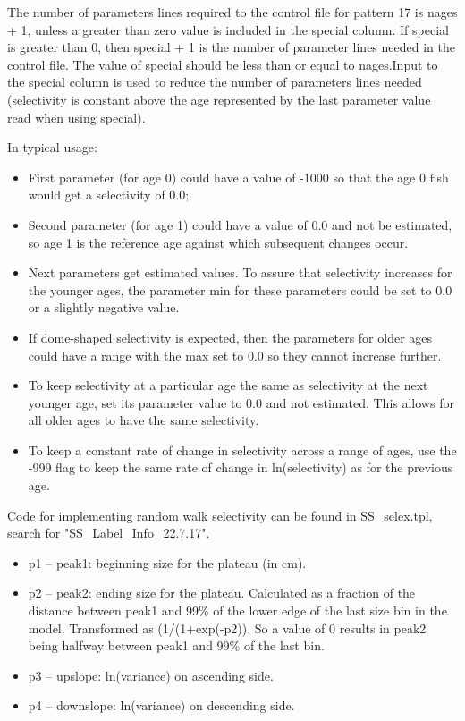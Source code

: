 The number of parameters lines required to the control file for pattern 17 is nages + 1, unless a greater than zero value is included in the special column. If special is greater than 0, then special + 1 is the number of parameter lines needed in the control file. The value of special should be less than or equal to nages.Input to the special column  is used to reduce the number of parameters lines needed (selectivity is constant above the age represented by the last parameter value read when using special). 
	
In typical usage:
	\begin{itemize}
		\item First parameter (for age 0) could have a value of -1000 so that the age 0 fish would get a selectivity of 0.0;
		\item 	Second parameter (for age 1) could have a value of 0.0 and not be estimated, so age 1 is the reference age against which subsequent changes occur.
		\item 	Next parameters get estimated values.  To assure that selectivity increases for the younger ages, the parameter min for these parameters could be set to 0.0 or a slightly negative value.
		\item If dome-shaped selectivity is expected, then the parameters for older ages could have a range with the max set to 0.0 so they cannot increase further.
		\item To keep selectivity at a particular age the same as selectivity at the next younger age, set its parameter value to 0.0 and not estimated.  This allows for all older ages to have the same selectivity.
		\item 	To keep a constant rate of change in selectivity across a range of ages, use the -999 flag to keep the same rate of change in ln(selectivity) as for the previous age.
	\end{itemize}

Code for implementing random walk selectivity can be found in \href{https://github.com/nmfs-stock-synthesis/stock-synthesis/blob/main/SS_selex.tpl}{SS\_selex.tpl}, search for "SS\_Label\_Info\_22.7.17".

	\begin{itemize}
		\item p1 – peak1: beginning size for the plateau (in cm).
		\item p2 – peak2: ending size for the plateau.  Calculated as a fraction of the distance between peak1 and 99\% of the lower edge of the last size bin in the model.  Transformed as (1/(1+exp(-p2)). So a value of 0 results in peak2 being halfway between peak1 and 99\% of the last bin.
		\item p3 – upslope: ln(variance) on ascending side.
		\item p4 – downslope:  ln(variance) on descending side.
	\end{itemize}


